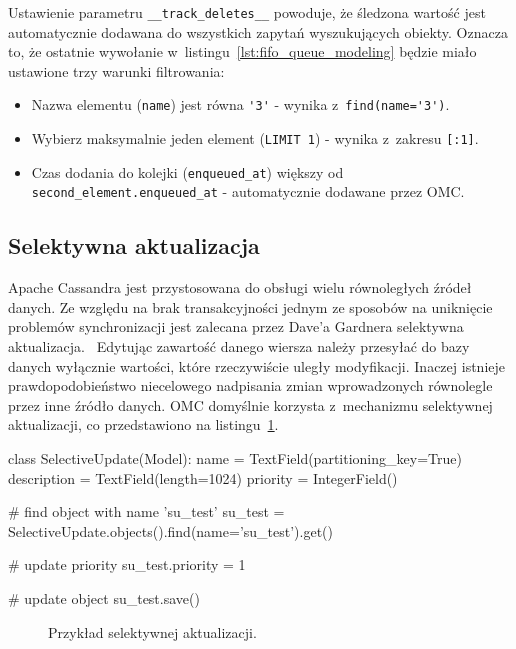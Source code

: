 Ustawienie parametru \verb+__track_deletes__+ powoduje, że śledzona wartość jest automatycznie dodawana do wszystkich zapytań wyszukujących obiekty. Oznacza to, że ostatnie wywołanie w~listingu~\ref{lst:fifo_queue_modeling} będzie miało ustawione trzy warunki filtrowania:

\begin{itemize}
	\item Nazwa elementu (\verb+name+) jest równa \verb+'3'+ - wynika z~\verb+find(name='3')+.
	\item Wybierz maksymalnie jeden element (\verb+LIMIT 1+) - wynika z~zakresu \verb+[:1]+.
	\item Czas dodania do kolejki (\verb+enqueued_at+) większy od \verb+second_element.enqueued_at+ - automatycznie dodawane przez OMC.
\end{itemize}

\subsection{Selektywna aktualizacja}

Apache Cassandra jest przystosowana do obsługi wielu równoległych źródeł danych. Ze względu na brak transakcyjności jednym ze sposobów na uniknięcie problemów synchronizacji jest zalecana przez Dave'a Gardnera selektywna aktualizacja.~\cite{cassandra_concepts_patterns_antipatterns} Edytując zawartość danego wiersza należy przesyłać do bazy danych wyłącznie wartości, które rzeczywiście uległy modyfikacji. Inaczej istnieje prawdopodobieństwo niecelowego nadpisania zmian wprowadzonych równolegle przez inne źródło danych. OMC domyślnie korzysta z~mechanizmu selektywnej aktualizacji, co przedstawiono na listingu~\ref{lst:selective_update_modeling}.

\begin{verbbox}
class SelectiveUpdate(Model):
    name = TextField(partitioning_key=True)
    description = TextField(length=1024)
    priority = IntegerField()

# find object with name 'su_test'
su_test = SelectiveUpdate.objects().find(name='su_test').get()

# update priority
su_test.priority = 1

# update object
su_test.save()
\end{verbbox}

\begin{figure}[ht!]
	\centering
	\theverbbox
	\caption{Przykład selektywnej aktualizacji.}
	\label{lst:selective_update_modeling}
\end{figure}

